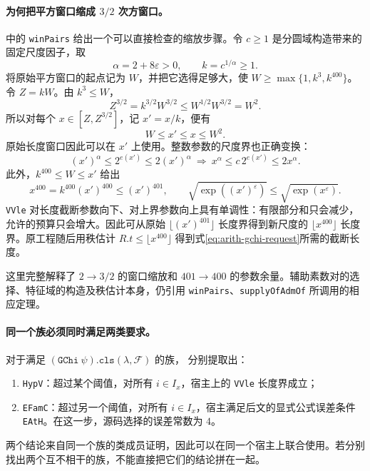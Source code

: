 \paragraph{为何把平方窗口缩成 $3/2$ 次方窗口。}
 中的 \texttt{winPairs} 给出一个可以直接检查的缩放步骤。令 $c\ge1$ 是分圆域构造带来的固定尺度因子，取
\[
\alpha=2+8\varepsilon>0,\qquad k=c^{1/\alpha}\ge1.
\]
将原始平方窗口的起点记为 $W$，并把它选得足够大，使
$W\ge\max\{1,k^3,k^{400}\}$。令 $Z=kW$。由 $k^3\le W$，
\[
Z^{3/2}=k^{3/2}W^{3/2}\le W^{1/2}W^{3/2}=W^2.
\]
所以对每个 $x\in[Z,Z^{3/2}]$，记 $x'=x/k$，便有
\[
W\le x'\le x\le W^2.
\]
原始长度窗口因此可以在 $x'$ 上使用。整数参数的尺度界也正确变换：
\[
(x')^\alpha\le2^{e(x')}\le2(x')^\alpha
\ \Longrightarrow\
x^\alpha\le c\,2^{e(x')}\le2x^\alpha.
\]
此外，$k^{400}\le W\le x'$ 给出
\[
x^{400}=k^{400}(x')^{400}\le(x')^{401},
\qquad
\sqrt{\exp((x')^\varepsilon)}\le\sqrt{\exp(x^\varepsilon)}.
\]
\texttt{VVle} 对长度截断参数向下、对上界参数向上具有单调性：有限部分和只会减少，允许的预算只会增大。因此可从原始 $\lfloor(x')^{401}\rfloor$ 长度界得到新尺度的 $\lfloor x^{400}\rfloor$ 长度界。原工程随后用秩估计 $R.t\le\lfloor x^{400}\rfloor$ 得到式\eqref{eq:arith-gchi-request}所需的截断长度。

这里完整解释了 $2\to3/2$ 的窗口缩放和 $401\to400$ 的参数余量。辅助素数对的选择、特征域的构造及秩估计本身，仍引用 \texttt{winPairs}、\texttt{supplyOfAdmOf} 所调用的相应定理。

\paragraph{同一个族必须同时满足两类要求。}
对于满足 $(\texttt{GChi}\ \psi).\texttt{cls}(\lambda,\mathcal F)$ 的族， 分别提取出：
\begin{enumerate}
\item \texttt{HypV}：超过某个阈值，对所有 $i\in I_x$，宿主上的 \texttt{VVle} 长度界成立；
\item \texttt{EFamC}：超过另一个阈值，对所有 $i\in I_x$，宿主满足后文的显式公式误差条件 \texttt{EAtH}。在这一步，源码选择的误差常数为 $4$。
\end{enumerate}
两个结论来自同一个族的类成员证明，因此可以在同一个宿主上联合使用。若分别找出两个互不相干的族，不能直接把它们的结论拼在一起。

